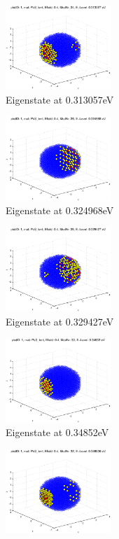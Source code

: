 \begin{figure}
	\centering
	\begin{subfigure}{150px}
		\includegraphics[width=150px]{Fig/Plots/r25v04Mod24}
		\caption{Eigenstate at 0.313057eV}
	\end{subfigure}
	\begin{subfigure}{150px}
		\includegraphics[width=150px]{Fig/Plots/r25v04Mod26}
		\caption{Eigenstate at 0.324968eV}
	\end{subfigure}
	\begin{subfigure}{150px}
		\includegraphics[width=150px]{Fig/Plots/r25v04Mod28}
		\caption{Eigenstate at  0.329427eV}
	\end{subfigure}
	\begin{subfigure}{150px}
		\includegraphics[width=150px]{Fig/Plots/r25v04Mod30}
		\caption{Eigenstate at 0.34852eV}
	\end{subfigure}
	\begin{subfigure}{150px}
		\includegraphics[width=150px]{Fig/Plots/r25v04Mod32}

\end{subfigure}
\end{figure}
